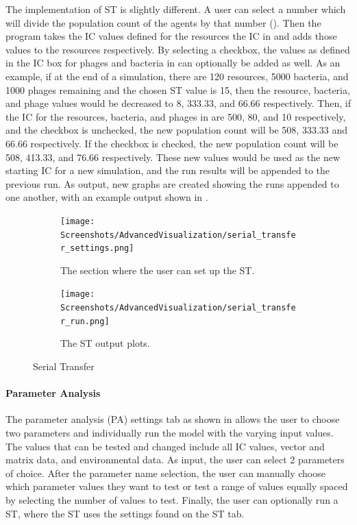 The implementation of ST is slightly different.
A user can select a number which will divide the population count of the agents by that number ().
Then the program takes the IC values defined for the resources the IC in  and adds those values to the resources respectively.
By selecting a checkbox, the values as defined in the IC box for phages and bacteria in  can optionally be added as well.
As an example, if at the end of a simulation, there are 120 resources, 5000 bacteria, and 1000 phages remaining and the chosen ST value is 15, then the resource, bacteria, and phage values would be decreased to 8, 333.33, and 66.66 respectively.
Then, if the IC for the resources, bacteria, and phages in  are 500, 80, and 10 respectively, and the checkbox is unchecked, the new population count will be 508, 333.33 and 66.66 respectively.
If the checkbox is checked, the new population count will be 508, 413.33, and 76.66 respectively.
These new values would be used as the new starting IC for a new simulation, and the run results will be appended to the previous run.
As output, new graphs are created showing the runs appended to one another, with an example output shown in .

\begin{figure}[h!]
    \centering
    \begin{subfigure}{0.49\linewidth}
        \centering
        \captionsetup{width=1\linewidth}
        \texttt{[image: Screenshots/AdvancedVisualization/serial\_transfer\_settings.png]}
        \caption{
            The section where the user can set up the ST.
        }
        \label{fig:ss:av:serial_transfer_settings}
    \end{subfigure}
    \hfill
    \begin{subfigure}{0.49\linewidth}
        \centering
        \captionsetup{width=1\linewidth}
        \texttt{[image: Screenshots/AdvancedVisualization/serial\_transfer\_run.png]}
        \caption{
            The ST output plots. 
        }
        \label{fig:ss:av:serial_transfer_run}
    \end{subfigure}
    \caption{Serial Transfer}
 \end{figure}

\paragraph{Parameter Analysis}
\label{sec:parameter_analysis}
The parameter analysis (PA) settings tab as shown in  allows the user to choose two parameters and individually run the model with the varying input values.
The values that can be tested and changed include all IC values, vector and matrix data, and environmental data.
As input, the user can select 2 parameters of choice.
After the parameter name selection, the user can manually choose which parameter values they want to test or test a range of values equally spaced by selecting the number of values to test.
Finally, the user can optionally run a ST, where the ST uses the settings found on the ST tab. 

